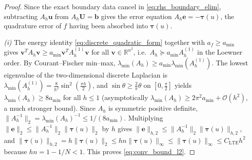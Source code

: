 \documentclass[11pt,a4paper]{article}
\theoremstyle{definition}
\theoremstyle{remark}
\begin{document}
\begin{proof}
Since the exact boundary data cancel in \eqref{eq:rhs_boundary_elim}, subtracting $A_h\bm{u}$ from $A_h\bm{U}=\bm{b}$ gives the error equation $A_h\bm{e}=-\bm{\tau}(u)$, the quadrature error of $f$ having been absorbed into $\bm{\tau}(u)$.

\emph{(i)} The energy identity \eqref{eq:discrete_quadratic_form} together with $a_f\ge a_{\min}$ gives
$\bm{v}^TA_h\bm{v}\ge a_{\min}\bm{v}^TA_h^{(1)}\bm{v}$ for all $\bm{v}\in\mathbb{R}^{n^2}$, i.e.\ $A_h\succeq a_{\min}A_h^{(1)}$ in the Loewner order. By Courant--Fischer min--max, $\lambda_{\min}(A_h)\ge a_{\min}\lambda_{\min}(A_h^{(1)})$. The lowest eigenvalue of the two-dimensional discrete Laplacian is $\lambda_{\min}(A_h^{(1)})=\frac{8}{h^2}\sin^2(\frac{\pi h}{2})$, and $\sin\theta\ge\frac{2}{\pi}\theta$ on $[0,\frac{\pi}{2}]$ yields $\lambda_{\min}(A_h)\ge 8a_{\min}$ for all $h\le1$ (asymptotically $\lambda_{\min}(A_h)\ge 2\pi^2a_{\min}+\mathcal{O}(h^2)$, a much stronger bound). Since $A_h$ is symmetric positive definite, $\|A_h^{-1}\|_2=\lambda_{\min}(A_h)^{-1}\le 1/(8a_{\min})$. Multiplying $\|\bm{e}\|_2\le\|A_h^{-1}\|_2\|\bm{\tau}(u)\|_2$ by $h$ gives $\|\bm{e}\|_{h,2}\le\|A_h^{-1}\|_2\|\bm{\tau}(u)\|_{h,2}$, and $\|\bm{\tau}(u)\|_{h,2}=h\|\bm{\tau}(u)\|_2\le hn\|\bm{\tau}(u)\|_\infty\le\|\bm{\tau}(u)\|_\infty\le C_{\text{LTE}}h^2$ because $hn=1-1/N<1$. This proves \eqref{eq:conv_bound_l2}.


\end{proof}
\end{document}
